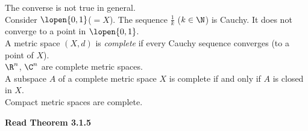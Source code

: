 The converse is not true in general. \\
\eg Consider $\lopen{0,1}$($=X$).  The sequence $\frac1k$ ($k\in\N$) is Cauchy.  It does not converge to a point in $\lopen{0,1}$. \\
 A metric space $(X,d)$ is \emph{complete} if every Cauchy sequence converges (to a point of $X$). \\
\prop $\R^n$, $\C^n$ are complete metric spaces. \\
\prop A subspace $A$ of a complete metric space $X$ is complete if and only if $A$ is closed in $X$. \\
\prop Compact metric spaces are complete.

\textbf{Read Theorem 3.1.5}
